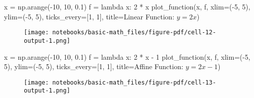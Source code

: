 \documentclass[
  letterpaper,
  DIV=11,
  numbers=noendperiod]{scrreprt}
\newenvironment{Shaded}{\begin{snugshade}}{\end{snugshade}}
\newcommand{\DecValTok}[1]{\textcolor[rgb]{0.68,0.00,0.00}{#1}}
\newcommand{\FloatTok}[1]{\textcolor[rgb]{0.68,0.00,0.00}{#1}}
\newcommand{\KeywordTok}[1]{\textcolor[rgb]{0.00,0.23,0.31}{#1}}
\newcommand{\NormalTok}[1]{\textcolor[rgb]{0.00,0.23,0.31}{#1}}
\newcommand{\OperatorTok}[1]{\textcolor[rgb]{0.37,0.37,0.37}{#1}}
\newcommand{\StringTok}[1]{\textcolor[rgb]{0.13,0.47,0.30}{#1}}
\begin{document}
\begin{Shaded}
\begin{Highlighting}[]
\NormalTok{x }\OperatorTok{=}\NormalTok{ np.arange(}\OperatorTok{{-}}\DecValTok{10}\NormalTok{, }\DecValTok{10}\NormalTok{, }\FloatTok{0.1}\NormalTok{)}
\NormalTok{f }\OperatorTok{=} \KeywordTok{lambda}\NormalTok{ x: }\DecValTok{2} \OperatorTok{*}\NormalTok{ x}
\NormalTok{plot\_function(x, f, xlim}\OperatorTok{=}\NormalTok{(}\OperatorTok{{-}}\DecValTok{5}\NormalTok{, }\DecValTok{5}\NormalTok{), ylim}\OperatorTok{=}\NormalTok{(}\OperatorTok{{-}}\DecValTok{5}\NormalTok{, }\DecValTok{5}\NormalTok{), ticks\_every}\OperatorTok{=}\NormalTok{[}\DecValTok{1}\NormalTok{, }\DecValTok{1}\NormalTok{], }
\NormalTok{              title}\OperatorTok{=}\StringTok{\textquotesingle{}Linear Function: $y=2x$\textquotesingle{}}\NormalTok{)}
\end{Highlighting}
\end{Shaded}

\begin{figure}[H]

{\centering \texttt{[image: notebooks/basic-math\_files/figure-pdf/cell-12-output-1.png]}

}

\end{figure}

\begin{Shaded}
\begin{Highlighting}[]
\NormalTok{x }\OperatorTok{=}\NormalTok{ np.arange(}\OperatorTok{{-}}\DecValTok{10}\NormalTok{, }\DecValTok{10}\NormalTok{, }\FloatTok{0.1}\NormalTok{)}
\NormalTok{f }\OperatorTok{=} \KeywordTok{lambda}\NormalTok{ x: }\DecValTok{2} \OperatorTok{*}\NormalTok{ x }\OperatorTok{{-}} \DecValTok{1}
\NormalTok{plot\_function(x, f, xlim}\OperatorTok{=}\NormalTok{(}\OperatorTok{{-}}\DecValTok{5}\NormalTok{, }\DecValTok{5}\NormalTok{), ylim}\OperatorTok{=}\NormalTok{(}\OperatorTok{{-}}\DecValTok{5}\NormalTok{, }\DecValTok{5}\NormalTok{), ticks\_every}\OperatorTok{=}\NormalTok{[}\DecValTok{1}\NormalTok{, }\DecValTok{1}\NormalTok{], }
\NormalTok{              title}\OperatorTok{=}\StringTok{\textquotesingle{}Affine Function: $y=2x{-}1$\textquotesingle{}}\NormalTok{)}
\end{Highlighting}
\end{Shaded}

\begin{figure}[H]

{\centering \texttt{[image: notebooks/basic-math\_files/figure-pdf/cell-13-output-1.png]}

}

\end{figure}
\end{document}
